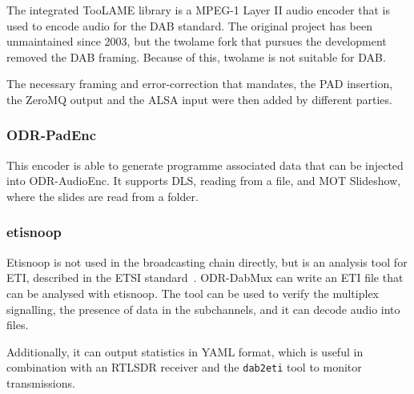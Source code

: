 The integrated TooLAME library is a MPEG-1 Layer II audio encoder that is used
to encode audio for the DAB standard. The original project has been unmaintained
since 2003, but the twolame fork that pursues the development removed the DAB
framing. Because of this, twolame is not suitable for DAB.

The necessary framing and error-correction that \dabplus{} mandates, the PAD
insertion, the ZeroMQ output and the ALSA input were then added by different
parties.

\subsubsection{ODR-PadEnc}
This encoder is able to generate programme associated data that can be injected
into ODR-AudioEnc. It supports DLS, reading from a file, and MOT Slideshow,
where the slides are read from a folder.

\subsubsection{etisnoop}
Etisnoop is not used in the broadcasting chain directly, but is an analysis tool
for ETI, described in the ETSI standard~\cite{etsidabeti}. ODR-DabMux can write
an ETI file that can be analysed with etisnoop. The tool can be used to verify
the multiplex signalling, the presence of data in the subchannels, and it can
decode audio into files.

Additionally, it can output statistics in YAML format, which is useful in
combination with an RTLSDR receiver and the \verb+dab2eti+ tool to monitor
transmissions.


